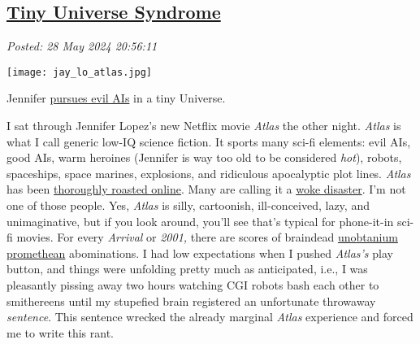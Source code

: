 %

\subsection*{\href{http://analyzethedatanotthedrivel.org/2024/05/28/tiny-universe-syndrome/}{Tiny Universe Syndrome}}


\noindent\emph{Posted: 28 May 2024 20:56:11}
\vspace{6pt}



\captionsetup[floatingfigure]{labelformat=empty}
 \begin{floatingfigure}[r]{0.26\textwidth}
 \centering
 \texttt{[image: jay\_lo\_atlas.jpg]}
 \caption{Jennifer \href{https://www.imdb.com/title/tt14856980/}{pursues evil AIs} in a tiny Universe.}
 \label{fig:8170x0}
 \end{floatingfigure} I sat through Jennifer Lopez's new Netflix movie \emph{Atlas} the other
night. \emph{Atlas} is what I call generic low-IQ science fiction. It
sports many sci-fi elements: evil AIs, good AIs, warm heroines (Jennifer
is way too old to be considered \emph{hot}), robots, spaceships, space
marines, explosions, and ridiculous apocalyptic plot lines. \emph{Atlas}
has been \href{https://www.rottentomatoes.com/m/atlas_2024}{thoroughly
roasted online}. Many are calling it a
\href{https://www.msn.com/en-us/money/news/you-re-about-to-get-a-sale-on-nvidia-jim-cramer-shares-insight-on-buying-during-pullbacks/ar-BB1n9fmx}{woke
disaster}. I'm not one of those people. Yes, \emph{Atlas} is silly,
cartoonish, ill-conceived, lazy, and unimaginative, but if you look
around, you'll see that's typical for phone-it-in sci-fi movies. For
every \emph{Arrival} or \emph{2001,} there are scores of braindead
\href{https://james-camerons-avatar.fandom.com/wiki/Unobtanium}{unobtanium}
\href{https://www.rottentomatoes.com/m/prometheus_2012}{promethean}
abominations. I had low expectations when I pushed \emph{Atlas's} play
button, and things were unfolding pretty much as anticipated, i.e., I
was pleasantly pissing away two hours watching CGI robots bash each
other to smithereens until my stupefied brain registered an unfortunate
throwaway \emph{sentence}. This sentence wrecked the already marginal
\emph{Atlas} experience and forced me to write this rant.

